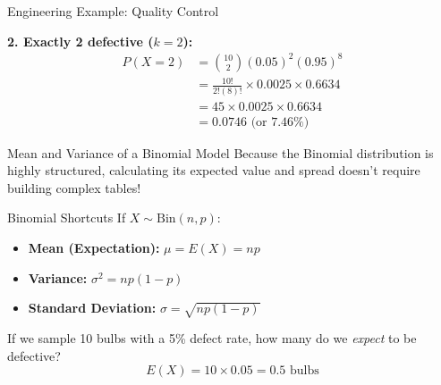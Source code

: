 \begin{frame}[allowframebreaks]{Engineering Example: Quality Control}
    \framebreak
    
    \begin{solutioncont}
        \textbf{2. Exactly 2 defective ($k=2$):}
        \begin{align*}
            P(X=2) &= \binom{10}{2} (0.05)^2 (0.95)^8 \\
                   &= \frac{10!}{2!(8)!} \times 0.0025 \times 0.6634 \\
                   &= 45 \times 0.0025 \times 0.6634 \\
                   &= \mathbf{0.0746} \text{ (or 7.46\%)}
        \end{align*}
    \end{solutioncont}
\end{frame}

\begin{frame}{Mean and Variance of a Binomial Model}
    Because the Binomial distribution is highly structured, calculating its expected value and spread doesn't require building complex tables!

    \vspace{0.3cm}
    \begin{block}{Binomial Shortcuts}
        If $X \sim \text{Bin}(n, p)$:
        \begin{itemize}
            \item \textbf{Mean (Expectation):} $\mu = E(X) = np$
            \item \textbf{Variance:} $\sigma^2 = np(1-p)$
            \item \textbf{Standard Deviation:} $\sigma = \sqrt{np(1-p)}$
        \end{itemize}
    \end{block}

    \pause \vspace{0.3cm}
    \begin{example}
        If we sample 10 bulbs with a 5\% defect rate, how many do we \textit{expect} to be defective?
        \[ E(X) = 10 \times 0.05 = \mathbf{0.5} \text{ bulbs} \]
    \end{example}
\end{frame}

